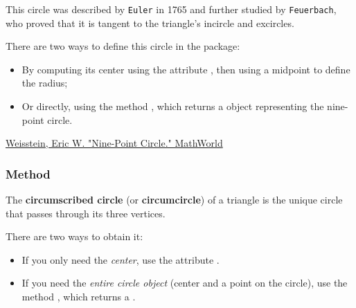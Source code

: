 This circle was described by \texttt{Euler} in 1765 and further studied by \texttt{Feuerbach}, who proved that it is tangent to the triangle’s incircle and excircles.

\medskip

There are two ways to define this circle in the package:
\begin{itemize}
  \item By computing its center using the attribute , then using a midpoint to define the radius;
  \item Or directly, using the method , which returns a  object representing the nine-point circle.
\end{itemize}
\begin{flushright}
\small
\href{https://mathworld.wolfram.com/Nine-PointCircle.html}{Weisstein, Eric W. "Nine-Point Circle." MathWorld}
\end{flushright}

\vspace{1em}
\begin{tkzexample}[latex=.5\textwidth]
\begin{center}
\end{center}
\end{tkzexample}

\subsubsection{Method } %
\label{ssub:method_triangle_circum_circle}

The \textbf{circumscribed circle} (or \textbf{circumcircle}) of a triangle is the unique circle that passes through its three vertices.

\medskip

There are two ways to obtain it:
\begin{itemize}
  \item If you only need the \emph{center}, use the attribute .
  \item If you need the \emph{entire circle object} (center and a point on the circle), use the method , which returns a .
\end{itemize}


